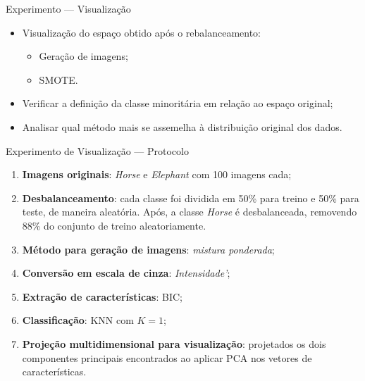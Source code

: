 \documentclass[10pt]{beamer}
\begin{document}
%
\begin{frame}{Experimento --- Visualização}
  \setlength\leftmargini{1em}
  \begin{itemize}
  \item Visualização do espaço obtido após o rebalanceamento:
    \begin{itemize}
      \item Geração de imagens;
      \item SMOTE.
    \end{itemize}
  \item Verificar a definição da classe minoritária em relação ao espaço original;
  \item Analisar qual método mais se assemelha à distribuição original dos dados.
  \end{itemize}
\end{frame}
\begin{frame}{Experimento de Visualização --- Protocolo}
  \setlength\leftmargini{1em}
  \begin{block}{}
        \begin{enumerate}
    \item \textbf{Imagens originais}: \emph{Horse} e \emph{Elephant} com 100 imagens cada;
    \item \textbf{Desbalanceamento}: cada classe foi dividida em 50\% para treino e 50\% para teste, de maneira aleatória. Após, a classe \textit{Horse} é desbalanceada, removendo 88\% do conjunto de treino aleatoriamente.
    \item \textbf{Método para geração de imagens}: \emph{mistura ponderada};
    \item \textbf{Conversão em escala de cinza}: \emph{Intensidade'};
    \item \textbf{Extração de características}: BIC;
    \item \textbf{Classificação}: KNN com $K=1$;
    \item \textbf{Projeção multidimensional para visualização}: projetados os dois componentes principais encontrados ao aplicar PCA nos vetores de características.
    \end{enumerate}
  \end{block}
\end{frame}
\end{document}
